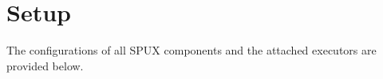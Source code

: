 \section{Setup}

The configurations of all SPUX components and the attached executors are provided below.


